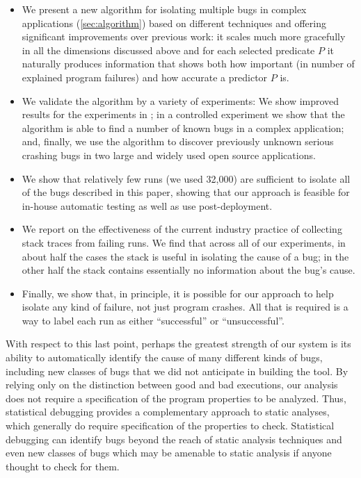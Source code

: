 \documentclass[draft]{sig-alternate}
\begin{document}
\begin{itemize}

\item We present a new algorithm for isolating multiple bugs in
complex applications (\autoref{sec:algorithm}) based on different
techniques and offering significant improvements over previous work:
it scales much more gracefully in all the dimensions discussed above
and for each selected predicate $P$ it naturally produces information
that shows both how important (in number of explained program
failures) and how accurate a predictor $P$ is.

\item We validate the algorithm by a variety of experiments: We show
improved results for the experiments in \cite{PLDI`03*141}; in a
controlled experiment we show that the algorithm is able to find a
number of known bugs in a complex application; and, finally, we use
the algorithm to discover previously unknown serious crashing bugs in
two large and widely used open source applications.

\item We show that relatively few runs (we used 32,000) are sufficient
to isolate all of the bugs described in this paper, showing that our
approach is feasible for in-house automatic testing as well as use
post-deployment.

\item We report on the effectiveness of the current industry practice
of collecting stack traces from failing runs.  We find that across all
of our experiments, in about half the cases the stack is useful in
isolating the cause of a bug; in the other half the stack contains
essentially no information about the bug's cause.

\item Finally, we show that, in principle, it is possible for our
approach to help isolate any kind of failure, not just program
crashes.  All that is required is a way to label each run as either
``successful'' or ``unsuccessful''.

\end{itemize}

With respect to this last point, perhaps the greatest strength of our
system is its ability to automatically identify the cause of many
different kinds of bugs, including new classes of bugs that we did not
anticipate in building the tool.  By relying only on the distinction
between good and bad executions, our analysis does not require a
specification of the program properties to be analyzed.  Thus,
statistical debugging provides a complementary approach to static
analyses, which generally do require specification of the properties
to check.  Statistical debugging can identify bugs beyond the reach of
static analysis techniques and even new classes of bugs which may be
amenable to static analysis if anyone thought to check for them.
\end{document}
